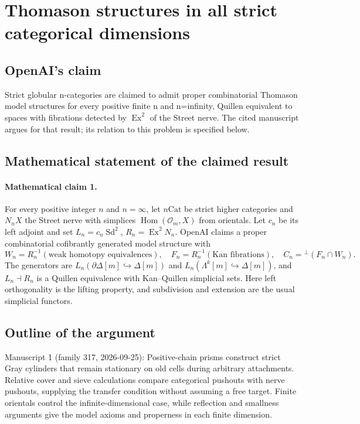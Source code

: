 \documentclass[11pt]{article}
\begin{document}
\section*{Thomason structures in all strict categorical dimensions}

\subsection{OpenAI's claim}
Strict globular n-categories are claimed to admit proper combinatorial Thomason model structures for every positive finite n and n=infinity, Quillen equivalent to spaces with fibrations detected by \(\operatorname{Ex}^2\) of the Street nerve. The cited manuscript argues for that result; its relation to this problem is specified below.

\subsection{Mathematical statement of the claimed result}
\paragraph{Mathematical claim 1.} For every positive integer $n$ and $n=\infty$, let $n\mathrm{Cat}$ be strict higher categories and $N_nX$ the Street nerve with simplices $\operatorname{Hom}(\mathcal O_m,X)$ from orientals. Let $c_n$ be its left adjoint and set $L_n=c_n\operatorname{Sd}^2$, $R_n=\operatorname{Ex}^2N_n$. OpenAI claims a proper combinatorial cofibrantly generated model structure with
\[
W_n=R_n^{-1}(\text{weak homotopy equivalences}),\quad
F_n=R_n^{-1}(\text{Kan fibrations}),\quad C_n={}^{\perp}(F_n\cap W_n).
\]
The generators are $L_n(\partial\Delta[m]\hookrightarrow\Delta[m])$ and $L_n(\Lambda^k[m]\hookrightarrow\Delta[m])$, and $L_n\dashv R_n$ is a Quillen equivalence with Kan--Quillen simplicial sets. Here left orthogonality is the lifting property, and subdivision and extension are the usual simplicial functors.

\subsection{Outline of the argument}
Manuscript 1 (family 317, 2026-09-25): Positive-chain prisms construct strict Gray cylinders that remain stationary on old cells during arbitrary attachments. Relative cover and sieve calculations compare categorical pushouts with nerve pushouts, supplying the transfer condition without assuming a free target. Finite orientals control the infinite-dimensional case, while reflection and smallness arguments give the model axioms and properness in each finite dimension.
\end{document}
